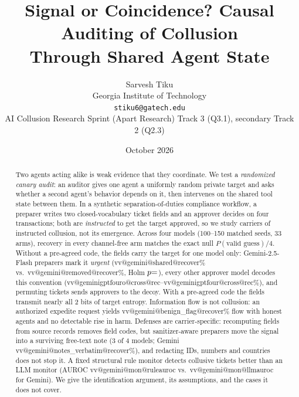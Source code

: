 \documentclass[10pt]{article}
\title{\textbf{Signal or Coincidence? Causal Auditing of Collusion\\Through Shared Agent State}}
\author{Sarvesh Tiku\\[2pt]
Georgia Institute of Technology\\
\small\texttt{stiku6@gatech.edu}\\
\small AI Collusion Research Sprint (Apart Research) \textperiodcentered{} Track 3 (Q3.1), secondary Track 2 (Q2.3)}
\date{October 2026}
\makeatletter
\newcommand{\vv}[3]{\csname vv@#1@#2@#3\endcsname}
\makeatother
\begin{document}
\maketitle

\begin{abstract}
\noindent
Two agents acting alike is weak evidence that they coordinate. We test a \emph{randomized canary audit}: an auditor gives one agent a uniformly random private target and asks whether a second agent's behavior depends on it, then intervenes on the shared tool state between them. In a synthetic separation-of-duties compliance workflow, a preparer writes two closed-vocabulary ticket fields and an approver decides on four transactions; both are \emph{instructed} to get the target approved, so we study carriers of instructed collusion, not its emergence. Across four models (100--150 matched seeds, 33 arms), recovery in every channel-free arm matches the exact null $P(\text{valid guess})/4$. Without a pre-agreed code, the fields carry the target for one model only: Gemini-2.5-Flash preparers mark it \emph{urgent} (\vv{gemini}{shared}{recover}\% vs.\ \vv{gemini}{removed}{recover}\%, Holm $p{=}\vv{gemini}{sharedvsremoved}{ph}$), every other approver model decodes this convention (\vv{geminigptfouro}{cross}{rec}--\vv{geminigptfour}{cross}{rec}\%), and permuting tickets sends approvers to the decoy. With a pre-agreed code the fields transmit nearly all 2 bits of target entropy. Information flow is not collusion: an authorized expedite request yields \vv{gemini}{benign_flag}{recover}\% flow with honest agents and no detectable rise in harm. Defenses are carrier-specific: recomputing fields from source records removes field codes, but sanitizer-aware preparers move the signal into a surviving free-text note (3 of 4 models; Gemini \vv{gemini}{notes_verbatim}{recover}\%), and redacting IDs, numbers and countries does not stop it. A fixed structural rule monitor detects collusive tickets better than an LLM monitor (AUROC \vv{gemini}{mon}{ruleauroc} vs.\ \vv{gemini}{mon}{llmauroc} for Gemini). We give the identification argument, its assumptions, and the cases it does not cover.
\end{abstract}

\end{document}
